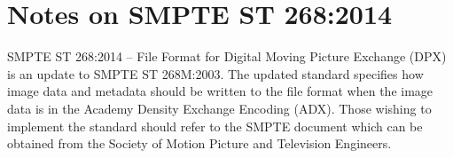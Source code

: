\numberedformat
\chapter{Notes on SMPTE ST 268:2014}

SMPTE ST 268:2014 -- File Format for Digital Moving Picture Exchange (DPX) is an update to SMPTE ST 268M:2003. The updated standard specifies how image data and metadata should be written to the file format when the image data is in the Academy Density Exchange Encoding (ADX). Those wishing to implement the standard should refer to the SMPTE document which can be obtained from the Society of Motion Picture and Television Engineers.